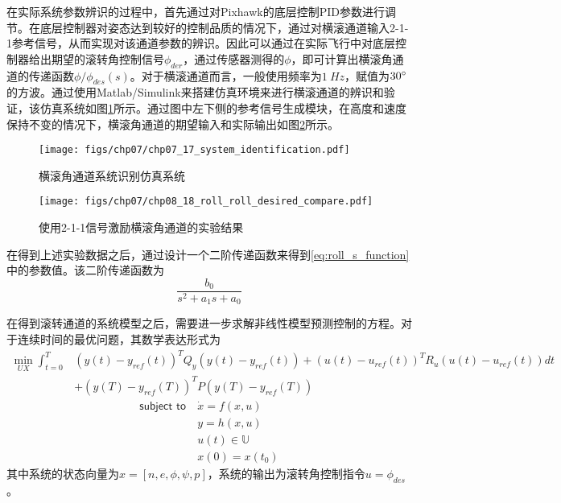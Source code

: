 在实际系统参数辨识的过程中，首先通过对Pixhawk的底层控制PID参数进行调节。在底层控制器对姿态达到较好的控制品质的情况下，通过对横滚通道输入2-1-1参考信号，从而实现对该通道参数的辨识。因此可以通过在实际飞行中对底层控制器给出期望的滚转角控制信号$\phi_{der}$，通过传感器测得的$\phi$，即可计算出横滚角通道的传递函数$\phi / \phi_{des}(s)$。对于横滚通道而言，一般使用频率为$1\ Hz$，赋值为$30 \degree$的方波。通过使用Matlab/Simulink来搭建仿真环境来进行横滚通道的辨识和验证，该仿真系统如图\ref{fig:chp07_17_system_identification}所示。通过图中左下侧的参考信号生成模块，在高度和速度保持不变的情况下，横滚角通道的期望输入和实际输出如图\ref{fig:chp08_18_roll_roll_desired_compare}所示。

\begin{figure}[ht]   
	\centering
	\texttt{[image: figs/chp07/chp07\_17\_system\_identification.pdf]}
	\caption{横滚角通道系统识别仿真系统}
	\label{fig:chp07_17_system_identification}
\end{figure}

\begin{figure}[ht]   
	\centering
	\texttt{[image: figs/chp07/chp08\_18\_roll\_roll\_desired\_compare.pdf]}
	\caption{使用2-1-1信号激励横滚角通道的实验结果}
	\label{fig:chp08_18_roll_roll_desired_compare}
\end{figure}

在得到上述实验数据之后，通过设计一个二阶传递函数来得到\ref{eq:roll_s_function}中的参数值。该二阶传递函数为
\begin{equation}
\frac{b_0}{s^2+a_1s+a_0}
\end{equation}

在得到滚转通道的系统模型之后，需要进一步求解非线性模型预测控制的方程。对于连续时间的最优问题，其数学表达形式为
\begin{align}
\min_{UX} \int_{t=0}^T &(y(t)-y_{ref}(t))^TQ_y(y(t)-y_{ref}(t))+(u(t)-u_{ref}(t))^T R_u (u(t)-u_{ref}(t))dt\\
&+ (y(T)-y_{ref}(T))^T P (y(T)-y_{ref}(T))
\end{align}
\begin{align}
\textsf{subject to}\  &\dot{x}=f(x,u) \\
&y=h(x,u) \\
&u(t) \in \mathbb{U} \\
&x(0) = x(t_0)
\end{align}
其中系统的状态向量为$x=[n,e,\phi,\psi,p]$，系统的输出为滚转角控制指令$u=\phi_{des}$。

